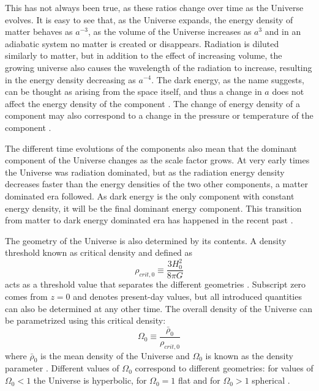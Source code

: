 \documentclass[english, oneside]{HYgradu}
\begin{document}
This has not always been true, as these ratios change over time as the Universe evolves. It is easy to see that, as the Universe expands, the energy density of matter behaves as $a^{-3}$, as the volume of the Universe increases as $a^3$ and in an adiabatic system no matter is created or disappears. Radiation is diluted similarly to matter, but in addition to the effect of increasing volume, the growing universe also causes the wavelength of the radiation to increase, resulting in the energy density decreasing as $a^{-4}$. The dark energy, as the name suggests, can be thought as arising from the space itself, and thus a change in $a$ does not affect the energy density of the component \citep{mo2010galaxy}. The change of energy density of a component may also correspond to a change in the pressure or temperature of the component \citep{mo2010galaxy}.

The different time evolutions of the components also mean that the dominant component of the Universe changes as the scale factor grows. At very early times the Universe was radiation dominated, but as the radiation energy density decreases faster than the energy densities of the two other components, a matter dominated era followed. As dark energy is the only component with constant energy density, it will be the final dominant energy component. This transition from matter to dark energy dominated era has happened in the recent past \citep{mo2010galaxy}.

The geometry of the Universe is also determined by its contents. A density threshold known as critical density and defined as
\begin{equation}
\rho_{crit,0} \equiv \frac{3H_0^2}{8\pi G}
\end{equation}
acts as a threshold value that separates the different geometries \citep{mo2010galaxy}. Subscript zero comes from $z=0$ and denotes present-day values, but all introduced quantities can also be determined at any other time. The overall density of the Universe can be parametrized using this critical density:
\begin{equation} \label{Omega}
\Omega_0 \equiv \frac{\bar \rho_0}{\rho_{crit,0}}
\end{equation}
where $\bar\rho_0$ is the mean density of the Universe and $\Omega_0$ is known as the density parameter \citep{mo2010galaxy}. Different values of $\Omega_0$ correspond to different geometries: for values of $\Omega_0 < 1$ the Universe is hyperbolic, for $\Omega_0 = 1$ flat and for  $\Omega_0 > 1$ spherical \citep{mo2010galaxy}.
\end{document}
